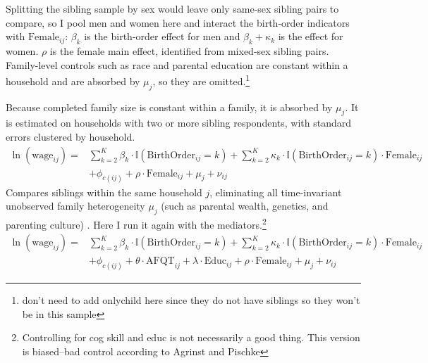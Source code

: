 \documentclass[12pt]{article}
\begin{document}
Splitting the sibling sample by sex would leave only same-sex sibling pairs to compare, so I pool men and women here and interact the birth-order indicators with $\text{Female}_{ij}$: $\beta_k$ is the birth-order effect for men and $\beta_k + \kappa_k$ is the effect for women. $\rho$ is the female main effect, identified from mixed-sex sibling pairs. Family-level controls such as race and parental education are constant within a household and are absorbed by $\mu_j$, so they are omitted.\footnote{don't need to add onlychild here since they do not have siblings so they won't be in this sample}

Because completed family size is constant within a family, it is absorbed by $\mu_j$. It is estimated on households with two or more sibling respondents, with standard errors clustered by household.
\begin{equation}
\begin{split}
\ln(\text{wage}_{ij}) = &\sum_{k=2}^{K} \beta_k \cdot \mathbb{I}(\text{BirthOrder}_{ij} = k) + \sum_{k=2}^{K} \kappa_k \cdot \mathbb{I}(\text{BirthOrder}_{ij} = k) \cdot \text{Female}_{ij} \\
&+ \phi_{c(ij)} + \rho \cdot \text{Female}_{ij} + \mu_j + \nu_{ij}
\end{split}
\label{eq:spec4a}
\end{equation}
Compares siblings within the same household $j$, eliminating all time-invariant unobserved family heterogeneity $\mu_j$ (such as parental wealth, genetics, and parenting culture) \citep{black, bronars, pav}. Here I run it again with the mediators.\footnote{Controlling for cog skill and educ is not necessarily a good thing. This version is biased--bad control according to Agrinst and Pischke}
\begin{equation}
\begin{split}
\ln(\text{wage}_{ij}) = &\sum_{k=2}^{K} \beta_k \cdot \mathbb{I}(\text{BirthOrder}_{ij} = k) + \sum_{k=2}^{K} \kappa_k \cdot \mathbb{I}(\text{BirthOrder}_{ij} = k) \cdot \text{Female}_{ij} \\
&+ \phi_{c(ij)} + \theta \cdot \text{AFQT}_{ij} + \lambda \cdot \text{Educ}_{ij} + \rho \cdot \text{Female}_{ij} + \mu_j + \nu_{ij}
\end{split}
\label{eq:spec4b}
\end{equation}
\end{document}
